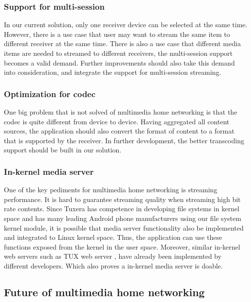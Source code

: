\subsubsection{Support for multi-session}
In our current solution, only one receiver device can be selected at the same time. However, there is a use case that user may want to stream the same item to different receiver at the same time. There is also a use case that different media items are needed to streamed to different receivers, the multi-session support becomes a valid demand. Further improvements should also take this demand into consideration, and integrate the support for multi-session streaming.
\subsubsection{Optimization for codec}
One big problem that is not solved of multimedia home networking is that the codec is quite different from device to device. Having aggregated all content sources, the application should also convert the format of content to a format that is supported by the receiver. In further development, the better transcoding support should be built in our solution.
\subsubsection{In-kernel media server}
One of the key pediments for multimedia home networking is streaming performance. It is hard to guarantee streaming quality when streaming high bit rate contents. Since Tuxera has competence in developing file systems in kernel space and has many leading Android phone manufacturers using our file system kernel module, it is possible that media server functionality also be implemented and integrated to Linux kernel space. Thus, the application can use these functions exposed from the kernel in the user space.
Moreover, similar in-kernel web servers such as TUX web server \cite{??}, have already been implemented by different developers. Which also proves a in-kernel media server is doable.
\subsection{Future of multimedia home networking}
